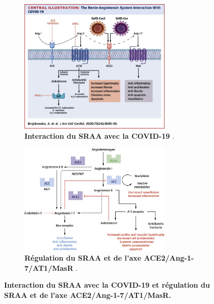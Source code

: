 \documentclass[
  a4paper,
  DIV=11,
  numbers=noendperiod,
  listof=totoc]{scrreprt}
\begin{document}
\begin{figure}[!htbp]
    \centering
    \begin{subfigure}{\textwidth}
        \centering
        \includegraphics[width=0.8\textwidth]{figures/Brojakowska-RAS-COVID-19.jpg}
        \caption{\textbf{Interaction du SRAA avec la COVID-19} \autocite{Brojakowska.2020}.}
        \label{fig-sraa-covid19}
    \end{subfigure}
    
    \bigskip
    
    \begin{subfigure}{\textwidth}
        \centering
        \includegraphics[width=0.8\textwidth]{figures/Brojakowska-RAS-ACE2-Regulation.jpg}
        \caption{\textbf{Régulation du SRAA et de l'axe ACE2/Ang-1-7/AT1/MasR} \autocite{Brojakowska.2020}.}
        \label{fig-ace2-masR}
    \end{subfigure}
    \caption[Interaction du SRAA avec la COVID-19 et régulation du SRAA et de l'axe ACE2/Ang-1-7/AT1/MasR.]{\textbf{Interaction du SRAA avec la COVID-19 et régulation du SRAA et de l'axe ACE2/Ang-1-7/AT1/MasR.}}
\end{figure}
\end{document}
